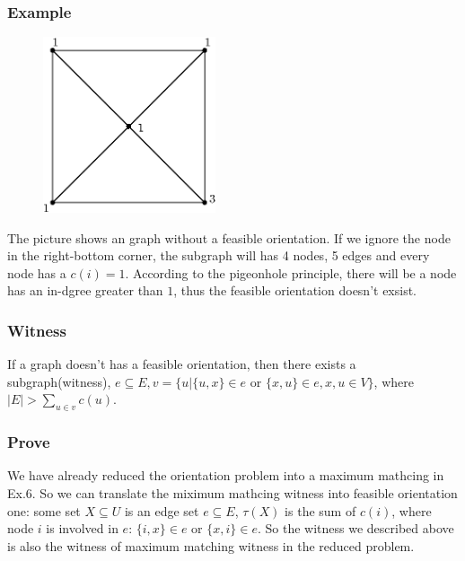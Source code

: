 \subsubsection*{Example}
	\begin{figure}[H]
		\centering\includegraphics[width=2in]{source/qwd/qc.eps}
	\end{figure}
	The picture shows an graph without a feasible orientation. If we ignore the node in the right-bottom corner, the subgraph will has 4 nodes, 5 edges and every node has a $c(i)=1$. According to the pigeonhole principle, there will be a node has an in-dgree greater than $1$, thus the feasible orientation doesn't exsist.
	\subsubsection*{Witness}
	If a graph doesn't has a feasible orientation, then there exists a subgraph(witness), $e\subseteq E,v=\{u|\{u,x\}\in e$ or $\{x,u\}\in e, x,u\in V\}$, where $|E|>\sum_{u\in v}c(u)$.
	\subsubsection*{Prove}
	We have already reduced the orientation problem into a maximum mathcing in Ex.6. So we can translate the miximum mathcing witness into feasible orientation one: some set $X\subseteq U$ is an edge set $e\subseteq E$, $\tau (X)$ is the sum of $c(i)$, where node $i$ is involved in $e$: $\{i, x\}\in e$ or $\{x, i\} \in e$. So the witness we described above is also the witness of maximum matching witness in the reduced problem.
